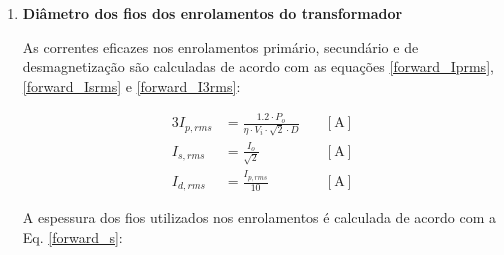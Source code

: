 \begin{apendicesenv}
\begin{enumerate}


\item \textbf{Diâmetro dos fios dos enrolamentos do transformador}
    
As correntes eficazes nos enrolamentos primário, secundário e de desmagnetização são calculadas de acordo com as equações \ref{forward_Iprms}, \ref{forward_Isrms} e \ref{forward_I3rms}: 
    
    \begin{alignat}{3}
        I_{p,rms} & = \frac{1.2 \cdot P_{o}}{\eta \cdot V_{i} \cdot \sqrt{2} \cdot D} \quad & [\text{A}]
        \label{forward_Isrms}\\
        I_{s,rms} & = \frac{I_{o}}{\sqrt{2}} \quad & [\text{A}]
        \label{forward_Iprms}\\
        I_{d,rms} & = \frac{I_{p,rms}}{10} \quad & [\text{A}]
        \label{forward_I3rms}
    \end{alignat}
    


    
A espessura dos fios utilizados nos enrolamentos é calculada de acordo com a Eq. \ref{forward_s}:


\end{enumerate}
\end{apendicesenv}
